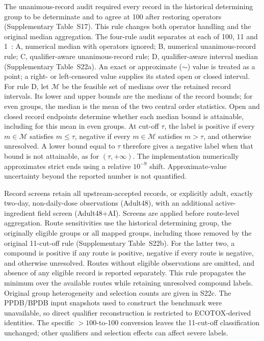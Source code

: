 \documentclass[10pt]{article}
\begin{document}
The unanimous-record audit required every record in the historical determining group to be determinate and to agree at 100 after restoring operators (Supplementary Table~S17). This rule changes both operator handling and the original median aggregation. The four-rule audit separates at each of 100, 11 and 1~\ugbee: A, numerical median with operators ignored; B, numerical unanimous-record rule; C, qualifier-aware unanimous-record rule; D, qualifier-aware interval median (Supplementary Table~S22a). An exact or approximate (\(\sim\)) value is treated as a point; a right- or left-censored value supplies its stated open or closed interval. For rule D, let \(\mathcal M\) be the feasible set of medians over the retained record intervals. Its lower and upper bounds are the medians of the record bounds; for even groups, the median is the mean of the two central order statistics. Open and closed record endpoints determine whether each median bound is attainable, including for this mean in even groups. At cut-off \(\tau\), the label is positive if every \(m\in\mathcal M\) satisfies \(m\leq\tau\), negative if every \(m\in\mathcal M\) satisfies \(m>\tau\), and otherwise unresolved. A lower bound equal to \(\tau\) therefore gives a negative label when that bound is not attainable, as for \((\tau,+\infty)\). The implementation numerically approximates strict ends using a relative \(10^{-9}\) shift. Approximate-value uncertainty beyond the reported number is not quantified.

Record screens retain all upstream-accepted records, or explicitly adult, exactly two-day, non-daily-dose observations (Adult48), with an additional active-ingredient field screen (Adult48+AI). Screens are applied before route-level aggregation. Route sensitivities use the historical determining group, the originally eligible groups or all mapped groups, including those removed by the original 11-cut-off rule (Supplementary Table~S22b). For the latter two, a compound is positive if any route is positive, negative if every route is negative, and otherwise unresolved. Routes without eligible observations are omitted, and absence of any eligible record is reported separately. This rule propagates the minimum over the available routes while retaining unresolved compound labels. Original group heterogeneity and selection counts are given in S22c. The PPDB/BPDB input snapshots used to construct the benchmark were unavailable, so direct qualifier reconstruction is restricted to ECOTOX-derived identities. The specific \(>100\)-to-100 conversion leaves the 11-cut-off classification unchanged; other qualifiers and selection effects can affect severe labels.
\end{document}
